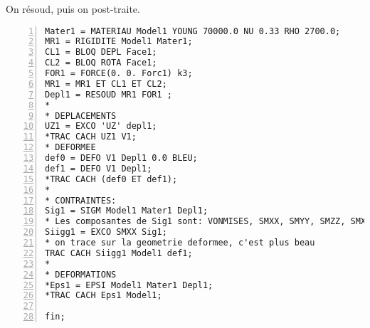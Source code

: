 \medskip
On résoud, puis on post-traite.

\begin{Verbatim}[numbers=left,numbersep=3pt,firstnumber=last]
Mater1 = MATERIAU Model1 YOUNG 70000.0 NU 0.33 RHO 2700.0;
MR1 = RIGIDITE Model1 Mater1;
CL1 = BLOQ DEPL Face1;
CL2 = BLOQ ROTA Face1;
FOR1 = FORCE(0. 0. Forc1) k3;
MR1 = MR1 ET CL1 ET CL2;
Depl1 = RESOUD MR1 FOR1 ;
*
* DEPLACEMENTS
UZ1 = EXCO 'UZ' depl1;
*TRAC CACH UZ1 V1;
* DEFORMEE
def0 = DEFO V1 Depl1 0.0 BLEU;
def1 = DEFO V1 Depl1;
*TRAC CACH (def0 ET def1);
*
* CONTRAINTES: 
Sig1 = SIGM Model1 Mater1 Depl1;
* Les composantes de Sig1 sont: VONMISES, SMXX, SMYY, SMZZ, SMXY, SMXZ, SMYZ
Siigg1 = EXCO SMXX Sig1;
* on trace sur la geometrie deformee, c'est plus beau
TRAC CACH Siigg1 Model1 def1;
*
* DEFORMATIONS
*Eps1 = EPSI Model1 Mater1 Depl1;
*TRAC CACH Eps1 Model1;

fin;
\end{Verbatim}
